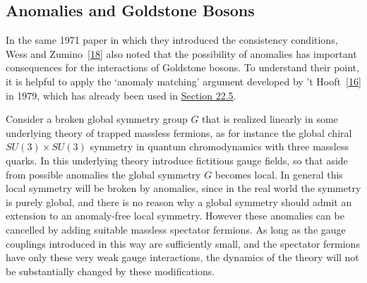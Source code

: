 \subsection{Anomalies and Goldstone Bosons}
\label{sec:22.7}

In the same 1971 paper in which they introduced the consistency
conditions, Wess and Zumino~\hyperref[ch22-ref-18]{[18]} also noted that
the possibility of anomalies has important consequences for the
interactions of Goldstone bosons. To understand their point, it is helpful
to apply the `anomaly matching' argument developed by
't Hooft~\hyperref[ch22-ref-16]{[16]} in 1979, which has already been used
in \hyperref[sec:22.5]{Section 22.5}.

Consider a broken global symmetry group $G$ that is realized linearly in
some underlying theory of trapped massless fermions, as for instance the
global chiral $SU(3)\times SU(3)$ symmetry in quantum chromodynamics with
three massless quarks. In this underlying theory introduce fictitious
gauge fields, so that aside from possible anomalies the global symmetry
$G$ becomes local. In general this local symmetry will be broken by
anomalies, since in the real world the symmetry is purely global, and
there is no reason why a global symmetry should admit an extension to an
anomaly-free local symmetry. However these anomalies can be cancelled by
adding suitable massless spectator fermions. As long as the gauge
couplings introduced in this way are sufficiently small, and the
spectator fermions have only these very weak gauge interactions, the
dynamics of the theory will not be substantially changed by these
modifications.

